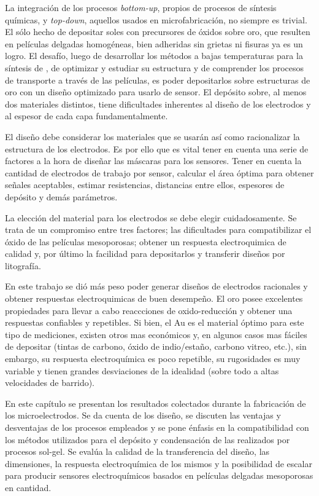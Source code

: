 	La integración de los procesos \textit{bottom-up}, propios de procesos de síntesis químicas, y \textit{top-down}, aquellos usados en microfabricación, no siempre es trivial. El sólo hecho de depositar soles con precursores de óxidos sobre oro, que resulten en películas delgadas homogéneas, bien adheridas sin grietas ni fisuras ya es un logro. El desafío, luego de desarrollar los métodos a bajas temperaturas para la síntesis de \pdm\space, de optimizar y estudiar su estructura y de comprender los procesos de transporte a través de las películas, es poder depositarlos sobre estructuras de oro con un diseño optimizado para usarlo de sensor. El depósito sobre, al menos dos materiales distintos, tiene dificultades inherentes al diseño de los electrodos y al espesor de cada capa fundamentalmente. 

	El diseño debe considerar los materiales que se usarán así como racionalizar la estructura de los electrodos. Es por ello que es vital tener en cuenta una serie de factores a la hora de diseñar las máscaras para los sensores. Tener en cuenta la cantidad de electrodos de trabajo por sensor, calcular el área óptima para obtener señales aceptables, estimar resistencias, distancias entre ellos, espesores de depósito y demás parámetros.

	La elección del material para los electrodos se debe elegir cuidadosamente. Se trata de un compromiso entre tres factores; las dificultades para compatibilizar el óxido de las películas mesoporosas; obtener un respuesta electroquimica de calidad y, por último la facilidad para depositarlos y transferir diseños por litografía.

	En este trabajo se dió más peso poder generar diseños de electrodos racionales y obtener respuestas electroquimicas de buen desempeño. El oro posee excelentes propiedades para llevar a cabo reaccciones de oxido-reducción y obtener una respuestas confiables y repetibles.\cite{Wi2000,Pumera2007,Gewirth2004,Villullas2000} Si bien, el Au es el material óptimo para este tipo de mediciones, existen otros mas económicos y, en algunos casos mas fáciles de depositar (tintas de carbono, óxido de indio/estaño, carbono vitreo, etc.), sin embargo, su respuesta electroquímica es poco repetible, su rugosidades es muy variable y tienen grandes desviaciones de la idealidad (sobre todo a altas velocidades de barrido). 

	En este capítulo se presentan los resultados colectados durante la fabricación de los microelectrodos. Se da cuenta de los diseño, se discuten las ventajas y desventajas de los procesos empleados y se pone énfasis en la compatibilidad con los métodos utilizados para el depósito y condensación de las \pdm\space realizados por procesos sol-gel. Se evalúa la calidad de la transferencia del diseño, las dimensiones, la respuesta electroquímica de los mismos y la posibilidad de escalar para producir sensores electroquímicos basados en películas delgadas mesoporosas en cantidad.


